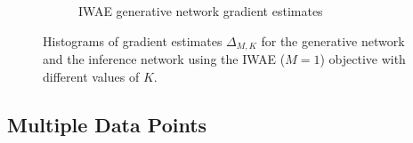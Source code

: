 \begin{figure}[t]
\begin{subfigure}[b]{0.4\textwidth}
		\caption{ \gls{IWAE} generative network gradient estimates \label{fig:snr/mu_hist_iwae}}
	\end{subfigure}\vspace{-6pt}
	\caption{Histograms of gradient estimates $\Delta_{M,K}$ for the generative network and 
		the inference network using the \gls{IWAE} ($M=1$)
		objective with different values of $K$.
			\vspace{-14pt}
		\label{fig:snr/hists}}
\end{figure}

\subsection{Multiple Data Points}
\label{sec:multi}


